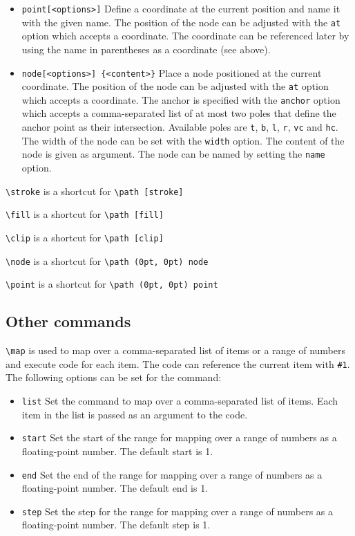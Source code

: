 \documentclass{article}
\begin{document}
\begin{itemize}
    \item \verb|point[<options>]| Define a coordinate at the current position and name it with the given name. The position of the node can be adjusted with the \verb|at| option which accepts a coordinate. The coordinate can be referenced later by using the name in parentheses as a coordinate (see above). 
    \item \verb|node[<options>] {<content>}| Place a node positioned at the current coordinate. The position of the node can be adjusted with the \verb|at| option which accepts a coordinate. The anchor is specified with the \verb|anchor| option which accepts a comma-separated list of at most two poles that define the anchor point as their intersection. Available poles are \verb|t|, \verb|b|, \verb|l|, \verb|r|, \verb|vc| and \verb|hc|. The width of the node can be set with the \verb|width| option. The content of the node is given as argument. The node can be named by setting the \verb|name| option.
\end{itemize}


\verb|\stroke| is a shortcut for \verb|\path [stroke]|

\verb|\fill| is a shortcut for \verb|\path [fill]|

\verb|\clip| is a shortcut for \verb|\path [clip]|

\verb|\node| is a shortcut for \verb|\path (0pt, 0pt) node|

\verb|\point| is a shortcut for \verb|\path (0pt, 0pt) point|

\subsection*{Other commands}

\verb|\map| is used to map over a comma-separated list of items or a range of numbers and execute code for each item. The code can reference the current item with \verb|#1|. The following options can be set for the command:

\begin{itemize}
    \item \verb|list| Set the command to map over a comma-separated list of items. Each item in the list is passed as an argument to the code.
    \item \verb|start| Set the start of the range for mapping over a range of numbers as a floating-point number. The default start is \num{1}.
    \item \verb|end| Set the end of the range for mapping over a range of numbers as a floating-point number. The default end is \num{1}.
    \item \verb|step| Set the step for the range for mapping over a range of numbers as a floating-point number. The default step is \num{1}.
\end{itemize}
\end{document}

